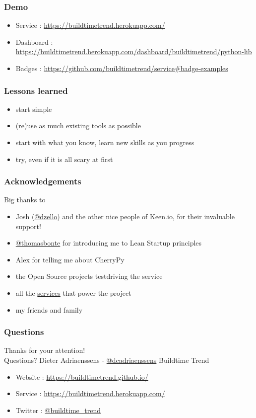 \documentclass[14pt]{beamer}
\begin{document}
  \begin{frame}
    \frametitle{Demo}
    \begin{itemize}
      \item Service : \href{https://buildtimetrend.herokuapp.com/}{\small{https://buildtimetrend.herokuapp.com/}}
      \item Dashboard : \href{https://buildtimetrend.herokuapp.com/dashboard/buildtimetrend/python-lib/index.html}{\small{https://buildtimetrend.herokuapp.com/dashboard/buildtimetrend/python-lib}}
      \item Badges : \href{https://github.com/buildtimetrend/service\#badge-examples}{\small{https://github.com/buildtimetrend/service\#badge-examples}}
    \end{itemize}
  \end{frame}
  \begin{frame}
    \frametitle{Lessons learned}
    \begin{itemize}
      \item start simple
      \item (re)use as much existing tools as possible
      \item start with what you know, learn new skills as you progress
      \item try, even if it is all scary at first
    \end{itemize}
  \end{frame}
  \begin{frame}
    \frametitle{Acknowledgements}
    Big thanks to
    \begin{itemize}
      \item Josh (\href{https://twitter.com/dzello}{@dzello}) and the other nice people of Keen.io, for their invaluable support!
      \item \href{https://twitter.com/thomasbonte}{@thomasbonte} for introducing me to Lean Startup principles
      \item Alex for telling me about CherryPy
      \item the Open Source projects testdriving the service
      \item all the \href{https://github.com/buildtimetrend/python-lib/wiki/Credits}{services} that power the project
      \item my friends and family
    \end{itemize}
  \end{frame}
  \begin{frame}
   \frametitle{Questions}
    Thanks for your attention!\\
    Questions?
    \vfill
    Dieter Adriaenssens - \href{https://twitter.com/dcadriaenssens}{\small{@dcadriaenssens}}
    \vfill
    Buildtime Trend
    \begin{itemize}
      \item Website : \href{https://buildtimetrend.github.io/}{\small{https://buildtimetrend.github.io/}}
      \item Service : \href{https://buildtimetrend.herokuapp.com/}{\small{https://buildtimetrend.herokuapp.com/}}
      \item Twitter : \href{https://twitter.com/buildtime_trend}{\small{@buildtime\_trend}}
    \end{itemize}
  \end{frame}
\end{document}
